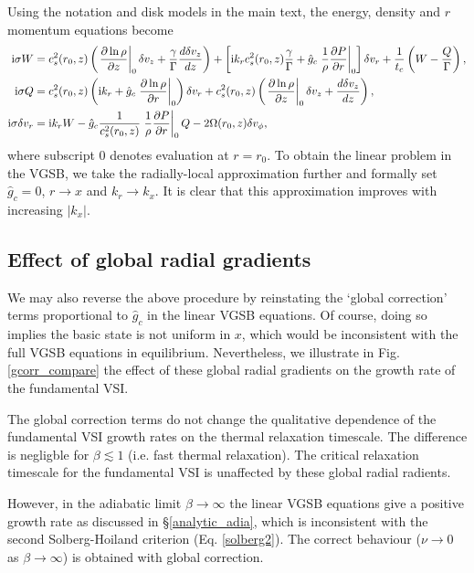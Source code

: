 Using the notation and disk models in the main text, the
energy, density and $r$ momentum equations become 
\begin{align}
  \mathrm{i} \sigma W  &=c _s^2(r_0, z)\left( \left.\frac{\partial\ln\rho}{\partial
      z}\right|_0 \delta v_z + \frac{\gamma}{\Gamma} \frac{d\delta
    v_z}{dz}\right) + \left[\mathrm{i} k_rc_s^2(r_0,z)
  \frac{\gamma}{\Gamma} + \hat{g}_c\left.\frac{1}{\rho}\frac{\partial P}{\partial
      r}\right|_0\right]\delta v_r  +
\frac{1}{t_c}\left(W-\frac{Q}{\Gamma}\right),\label{gcorr_terms1}\\
\mathrm{i} \sigma Q &= c_s^2(r_0,z)\left(\mathrm{i} k_r + \hat{g}_c
  \left.\frac{\partial\ln{\rho}}{\partial r}\right|_0\right)\delta v_r + c _s^2(r_0, z)\left( \left.\frac{\partial\ln\rho}{\partial
      z}\right|_0 \delta v_z + \frac{d\delta
    v_z}{dz}\right),\label{gcorr_terms2} \\
\mathrm{i} \sigma \delta v_r & = \mathrm{i} k_r W  -
\hat{g}_c\frac{1}{c_s^2(r_0,z)}\left.\frac{1}{\rho}\frac{\partial P}{\partial
  r}\right|_0Q - 2\Omega(r_0,z)\delta v_\phi,\label{gcorr_terms3}
\end{align}
where subscript $0$ denotes evaluation at $r=r_0$. To obtain the
linear problem in the VGSB, we take the radially-local 
approximation further and formally set $\hat{g}_c=0$, $r\to x$ and
$k_r\to k_x$. It is clear that this approximation improves with
increasing $|k_x|$.   


\subsection{Effect of global radial gradients}
We may also reverse the above procedure by reinstating the `global
correction' terms proportional to $\hat{g}_c$ in the linear VGSB
equations. Of course, doing so implies the basic state is not uniform
in $x$, which would be inconsistent with the full VGSB equations in
equilibrium. Nevertheless, we illustrate in Fig. \ref{gcorr_compare} the effect of
these global radial gradients on the growth rate of the fundamental
VSI.  

The global correction terms do not change the qualitative dependence
of the fundamental VSI growth rates on the thermal relaxation
timescale. The difference is negligble for $\beta\lesssim 1$ (i.e.
fast thermal relaxation). The critical relaxation timescale for the
fundamental VSI is unaffected by these global radial radients. 

However, in the adiabatic limit $\beta\to\infty$ the linear VGSB
equations give a positive growth rate as discussed in
\S\ref{analytic_adia}, which is inconsistent with the second
Solberg-Hoiland criterion (Eq. \ref{solberg2}). The correct behaviour
($\nu\to0$ as $\beta\to\infty$) is obtained with global correction.  

